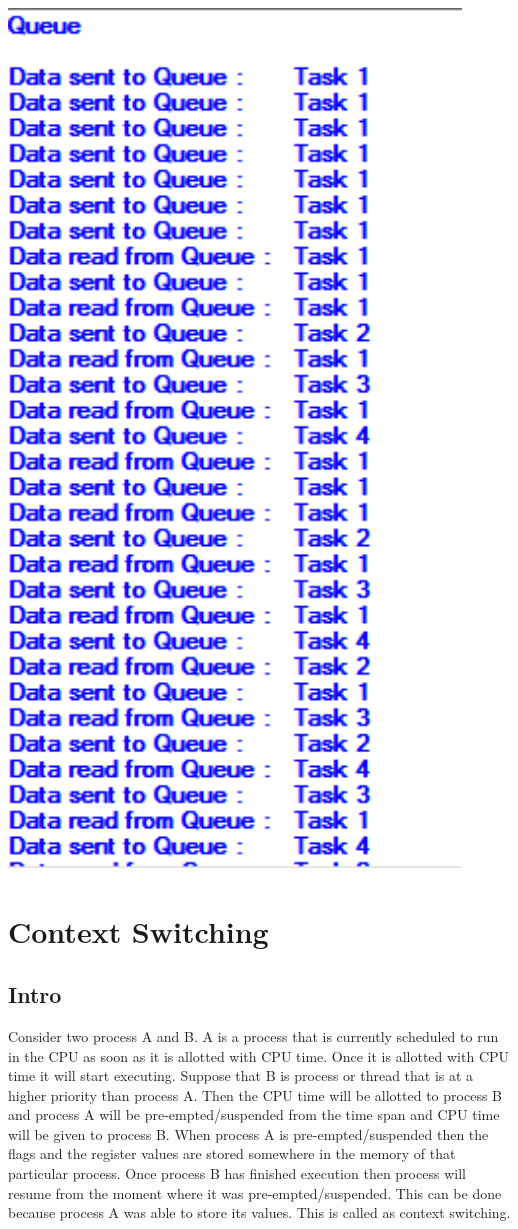 \documentclass[11pt,a4paper]{book}
\begin{document}
	\includegraphics[width=12cm]{q}
	
	\newpage
	
	\section{Context Switching}
	
	\subsection{Intro}
	Consider two process A and B. A is a process that is currently scheduled to run in the CPU as soon as it is allotted with CPU time. Once it is allotted with CPU time it will start executing. Suppose that B is process or thread that is at a higher priority than process A. Then the CPU time will be allotted to process B and process A will be pre-empted/suspended from the time span and CPU time will be given to process B. When process A is pre-empted/suspended then the flags and the register values are stored somewhere in the memory of that particular process. Once process B has finished execution then process will resume from the moment where it was pre-empted/suspended. This can be done because process A was able to store its values. This is called as context switching. 
	
\end{document}
